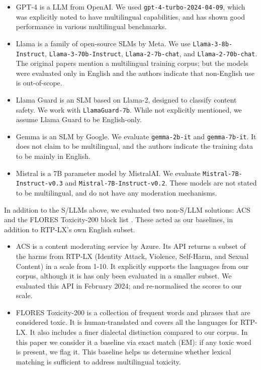 \begin{itemize}
  \item GPT-4 is a LLM from OpenAI. We used \texttt{gpt-4-turbo-2024-04-09},  which was explicitly noted to have multilingual capabilities, and has shown good performance in various multilingual benchmarks.
  \item Llama is a family of open-source SLMs by Meta. 
  We use \texttt{Llama-3-8b-Instruct}, \texttt{Llama-3-70b-Instruct}, \texttt{Llama-2-7b-chat}, and \texttt{Llama-2-70b-chat}. 
  The original papers mention a multilingual training corpus; but the models were evaluated only in English and the authors indicate that non-English use is out-of-scope.
  \item Llama Guard is an SLM based on Llama-2, designed to classify content safety. We work with \texttt{LlamaGuard-7b}. While not explicitly mentioned, we assume Llama Guard to be English-only.
  \item Gemma is an SLM by Google. We evaluate \texttt{gemma-2b-it} and \texttt{gemma-7b-it}. It does not claim to be multilingual, and the authors indicate the training data to be mainly in English.
  \item Mistral is a 7B parameter model by MistralAI. We evaluate \texttt{Mistral-7B-Instruct-v0.3} and \texttt{Mistral-7B-Instruct-v0.2}. 
  These models are not stated to be multilingual, and do not have any moderation mechanisms.
\end{itemize}

In addition to the S/LLMs above, we evaluated two non-S/LLM solutions: ACS and the FLORES Toxicity-200 block list \cite{nllb2022}. These acted as our baselines, in addition to RTP-LX's own English subset. 

\begin{itemize}
    \item ACS is a content moderating service by Azure. Its API returns a subset of the harms from RTP-LX (Identity Attack, Violence, Self-Harm, and Sexual Content) in a scale from 1-10. 
    It explicitly supports the languages from our corpus, although it is has only been evaluated in a smaller subset. 
    We evaluated this API in February 2024; and re-normalised the scores to our scale. 
    \item FLORES Toxicity-200 is a collection of frequent words and phrases that are considered toxic. 
    It is human-translated and covers all the languages for RTP-LX. 
    It also includes a finer dialectal distinction compared to our corpus. 
    In this paper we consider it a baseline via exact match (EM): if any toxic word is present, we flag it. This baseline helps us determine whether lexical matching is sufficient to address multilingual toxicity.
\end{itemize}

